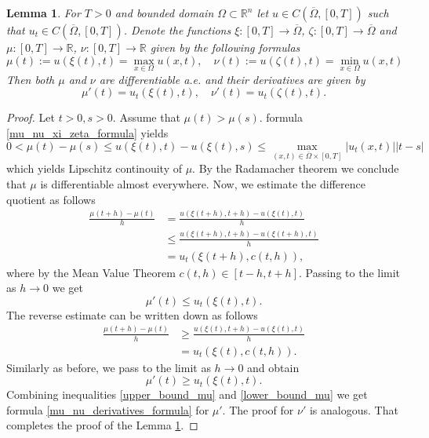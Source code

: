 \documentclass[12pt, a4paper]{article}
\theoremstyle{break}
\theoremstyle{break}
\theoremstyle{break}
\theoremstyle{break}
\newtheorem{lem}{Lemma}[section]
\theoremstyle{break}
\begin{document}
\begin{lem}
    For $T > 0$ and bounded domain $\Omega \subset \mathbb{R}^n$ let $u \in C\left(\overline{\Omega}, [0, T]\right)$ such that $u_t \in C\left(\overline{\Omega}, [0, T]\right)$. Denote the functions $\xi: [0, T] \rightarrow \overline{\Omega}$, $\zeta: [0, T] \rightarrow \overline{\Omega}$ and $\mu: [0, T] \rightarrow \mathbb{R}$, $\nu: [0, T] \rightarrow \mathbb{R}$ given by the following formulas
    \begin{equation}
        \mu(t) := u(\xi(t), t) = \max_{x \in \Omega} u(x,t), \quad \nu(t) := u(\zeta(t), t) = \min_{x \in \Omega} u(x,t)
        \label{mu_nu_xi_zeta_formula}
    \end{equation}
    Then both $\mu$ and $\nu$ are differentiable a.e. and their derivatives are given by
    \begin{equation}
        \mu'(t) = u_t(\xi(t), t), \quad \nu'(t) = u_t(\zeta(t), t).
        \label{mu_nu_derivatives_formula}
    \end{equation} 
    \label{lem:mu_nu_differentiability}
\end{lem}
\begin{proof}
    Let $t > 0, s > 0$. Assume that $\mu(t) > \mu(s)$. formula \eqref{mu_nu_xi_zeta_formula} yields
    \begin{equation*}
        0 < \mu(t) - \mu(s) \leq u(\xi(t), t) - u(\xi(t), s) \leq \max_{(x,t) \in \overline{\Omega} \times [0, T]}|u_t(x,t)||t-s|
    \end{equation*}
    which yields Lipschitz continouity of $\mu$. By the Radamacher theorem \cite{Evans} we conclude that $\mu$ is differentiable almost everywhere. Now, we estimate the difference quotient as follows
    \begin{align*}
        \frac{\mu(t+h) - \mu(t)}{h} 
        &= \frac{u(\xi(t+h),t+h) - u(\xi(t), t)}{h} \\
        &\leq \frac{u(\xi(t+h),t+h) - u(\xi(t+h), t)}{h} \\
        &= u_t(\xi(t+h), c(t, h)),
    \end{align*}
    where by the Mean Value Theorem $c(t, h) \in [t-h, t+h]$. Passing to the limit as $h \rightarrow 0$ we get
    \begin{equation}
        \mu'(t) \leq u_t(\xi(t), t).
        \label{upper_bound_mu}
    \end{equation}
    The reverse estimate can be written down as follows
    \begin{align*}
        \frac{\mu(t+h) - \mu(t)}{h}
        &\geq \frac{u(\xi(t),t+h) - u(\xi(t), t)}{h} \\
        &= u_t(\xi(t), c(t, h)).
    \end{align*}
    Similarly as before, we pass to the limit as $h \rightarrow 0$ and obtain
    \begin{equation}
        \mu'(t) \geq u_t(\xi(t), t).
        \label{lower_bound_mu}
    \end{equation}
    Combining inequalities \eqref{upper_bound_mu} and \eqref{lower_bound_mu} we get formula \eqref{mu_nu_derivatives_formula} for $\mu'$. The proof for $\nu'$ is analogous. That completes the proof of the Lemma \ref{lem:mu_nu_differentiability}.
\end{proof}
\end{document}
